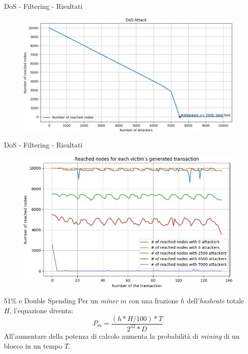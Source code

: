 \documentclass{beamer}
\begin{document}
\begin{frame}{DoS - Filtering - Risultati}
	\begin{figure}
		\centering
        \includegraphics[width=\linewidth]{./images/attackDOS.png}
	\end{figure}
\end{frame}

\begin{frame}{DoS - Filtering - Risultati}
	\begin{figure}
		\centering
        \includegraphics[width=\linewidth]{./images/DOS-mix.png}
	\end{figure}
\end{frame}


\begin{frame}{51\% e Double Spending}
    Per un \textit{miner} $m$ con una frazione $h$ dell'\textit{hashrate} totale $H$, l'equazione diventa:
   	\begin{equation}
    	P_{m} = \frac{(h*H/100) * T}{2^{32} * D}
    \end{equation}
    All'aumentare della potenza di calcolo aumenta la probabilità di \textit{mining} di un blocco in un tempo $T$.
\end{frame}
\end{document}
